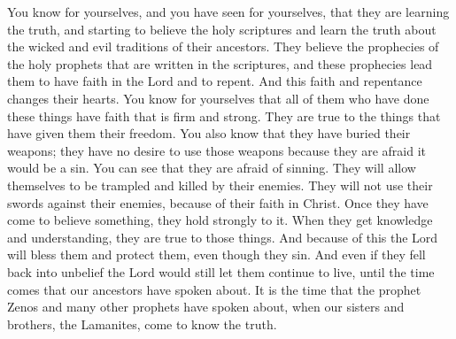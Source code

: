 You know for yourselves, and you have seen for yourselves, that they are learning the truth, and starting to believe the holy scriptures and learn the truth about the wicked and evil traditions of their ancestors. They believe the prophecies of the holy prophets that are written in the scriptures, and these prophecies lead them to have faith in the Lord and to repent. And this faith and repentance changes their hearts.
\bverse \iffalse Therefore, as many as have come to this, ye know of yourselves are firm and steadfast in the faith, and in the thing wherewith they have been made free. \fi
You know for yourselves that all of them who have done these things have faith that is firm and strong. They are true to the things that have given them their freedom.
\bverse \iffalse And ye know also that they have buried their weapons of war, and they fear to take them up lest by any means they should sin; yea, ye can see that they fear to sin--for behold they will suffer themselves that they be trodden down and slain by their enemies, and will not lift their swords against them, and this because of their faith in Christ. \fi
You also know that they have buried their weapons; they have no desire to use those weapons because they are afraid it would be a sin. You can see that they are afraid of sinning. They will allow themselves to be trampled and killed by their enemies. They will not use their swords against their enemies, because of their faith in Christ.
\bverse \iffalse And now, because of their steadfastness when they do believe in that thing which they do believe, for because of their firmness when they are once enlightened, behold, the Lord shall bless them and prolong their days, notwithstanding their iniquity-- \fi
Once they have come to believe something, they hold strongly to it. When they get knowledge and understanding, they are true to those things. And because of this the Lord will bless them and protect them, even though they sin.
\bverse \iffalse Yea, even if they should dwindle in unbelief the Lord shall prolong their days, until the time shall come which hath been spoken of by our fathers, and also by the prophet Zenos, and many other prophets, concerning the restoration of our brethren, the Lamanites, again to the knowledge of the truth-- \fi
And even if they fell back into unbelief the Lord would still let them continue to live, until the time comes that our ancestors have spoken about. It is the time that the prophet Zenos and many other prophets have spoken about, when our sisters and brothers, the Lamanites, come to know the truth.
